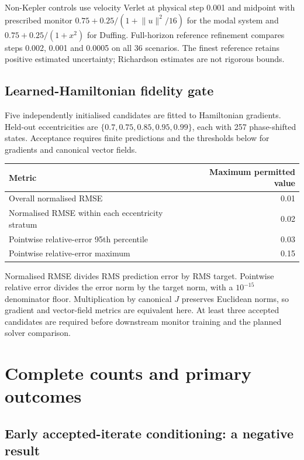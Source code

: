 \documentclass[11pt]{article}
\begin{document}
Non-Kepler controls use velocity Verlet at physical step 0.001 and
midpoint with prescribed monitor $0.75+0.25/(1+\lVert u\rVert^2/16)$
for the modal system and $0.75+0.25/(1+x^2)$ for Duffing.
Full-horizon reference refinement compares steps 0.002, 0.001 and 0.0005
on all 36 scenarios. The finest reference retains positive estimated
uncertainty; Richardson estimates are not rigorous bounds.

\subsection{Learned-Hamiltonian fidelity gate}

Five independently initialised candidates are fitted to Hamiltonian
gradients. Held-out eccentricities are $\{0.7,0.75,0.85,0.95,0.99\}$,
each with 257 phase-shifted states. Acceptance requires finite predictions
and the thresholds below for gradients and canonical vector fields.
\begin{center}
\begin{tabular}{lr}
\toprule
Metric & Maximum permitted value\\
\midrule
Overall normalised RMSE & 0.01\\
Normalised RMSE within each eccentricity stratum & 0.02\\
Pointwise relative-error 95th percentile & 0.03\\
Pointwise relative-error maximum & 0.15\\
\bottomrule
\end{tabular}
\end{center}
Normalised RMSE divides RMS prediction error by RMS target. Pointwise
relative error divides the error norm by the target norm, with a
$10^{-15}$ denominator floor. Multiplication by canonical $J$ preserves
Euclidean norms, so gradient and vector-field metrics are equivalent
here. At least three accepted candidates are required before downstream
monitor training and the planned solver comparison.

\section{Complete counts and primary outcomes}

\subsection{Early accepted-iterate conditioning: a negative result}
\label{sec:early-conditioning}
\end{document}

